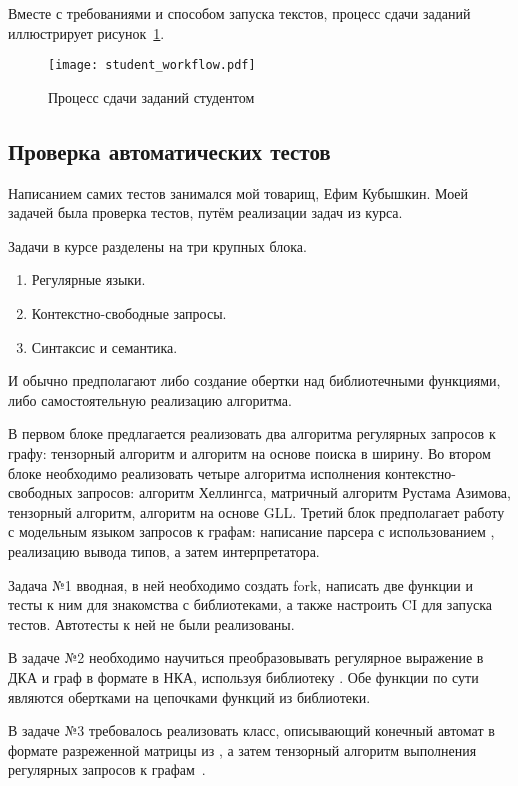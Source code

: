 Вместе с требованиями и способом запуска текстов, процесс сдачи заданий иллюстрирует рисунок~\ref{fig:workflow}.

\begin{figure}[h]
    \caption{Процесс сдачи заданий студентом}
    \label{fig:workflow}
    \texttt{[image: student\_workflow.pdf]}
\end{figure}

\subsection{Проверка автоматических тестов}
\label{subsec:slns}

Написанием самих тестов занимался мой товарищ, Ефим Кубышкин.
Моей задачей была проверка тестов, путём реализации задач из курса.

Задачи в курсе разделены на три крупных блока.
\begin{enumerate}
    \item Регулярные языки.
    \item Контекстно-свободные запросы.
    \item Синтаксис и семантика.
\end{enumerate}
И обычно предполагают либо создание обертки над библиотечными функциями, либо самостоятельную реализацию алгоритма.

В первом блоке предлагается реализовать два алгоритма регулярных запросов к графу: тензорный алгоритм и алгоритм на основе поиска в ширину.
Во втором блоке необходимо реализовать четыре алгоритма исполнения контекстно-свободных запросов: алгоритм Хеллингса, матричный алгоритм Рустама Азимова, тензорный алгоритм, алгоритм на основе GLL.
Третий блок предполагает работу с модельным языком запросов к графам: написание парсера с использованием \antlr{}, реализацию вывода типов, а затем интерпретатора.

Задача №1 вводная, в ней необходимо создать fork, написать две функции и тесты к ним для знакомства с библиотеками, а также настроить CI для запуска тестов.
Автотесты к ней не были реализованы.

В задаче №2 необходимо научиться преобразовывать регулярное выражение в ДКА и граф в формате \networkx{} в НКА, используя библиотеку \pyformlang{}.
Обе функции по сути являются обертками на цепочками функций из библиотеки.

В задаче №3 требовалось реализовать класс, описывающий конечный автомат в формате разреженной матрицы из \scipy{}, а затем тензорный алгоритм выполнения регулярных запросов к графам~\cite{shemetovaOneAlgorithmEvaluate2021}.

